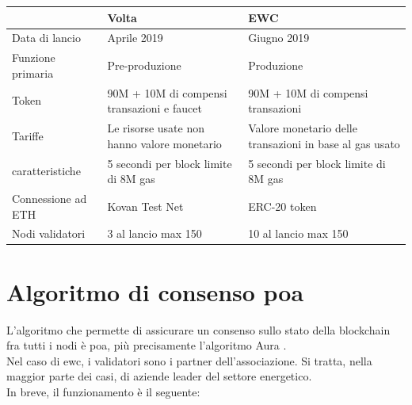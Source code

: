 \documentclass[12pt, letterpaper, twoside]{article}
\begin{document}
\begin{tabular}{||p{4cm}|p{5cm} p{5cm}||}
    \hline
                       & Volta                                               & EWC                                                     \\ [0.5ex]
    \hline\hline
    Data di lancio     & Aprile 2019                                         & Giugno 2019                                             \\
    \hline
    Funzione primaria  & Pre-produzione                                      & Produzione                                              \\
    \hline
    Token              & 90M + 10M di compensi \newline transazioni e faucet & 90M + 10M di compensi \newline transazioni              \\
    \hline
    Tariffe            & Le risorse usate non hanno valore monetario         & Valore monetario delle transazioni in base al gas usato \\
    \hline
    caratteristiche    & 5 secondi per block \newline limite di 8M gas       & 5 secondi per block \newline limite di 8M gas           \\
    \hline
    Connessione ad ETH & Kovan Test Net                                      & ERC-20 token                                            \\
    \hline
    Nodi validatori    & 3 al lancio \newline max 150                        & 10 al lancio \newline max 150                           \\ [1ex]
    \hline
\end{tabular}

\newpage

\section{Algoritmo di consenso \gls{poa}}
L'algoritmo che permette di assicurare un consenso sullo stato della blockchain fra tutti i nodi è \gls{poa}, più precisamente l'algoritmo Aura \cite{art:aura}\cite{wiki:poa}. \\
Nel caso di \gls{ewc}, i validatori sono i partner dell'associazione.
Si tratta, nella maggior parte dei casi, di aziende leader del settore energetico. \\
In breve, il funzionamento è il seguente:
\end{document}
